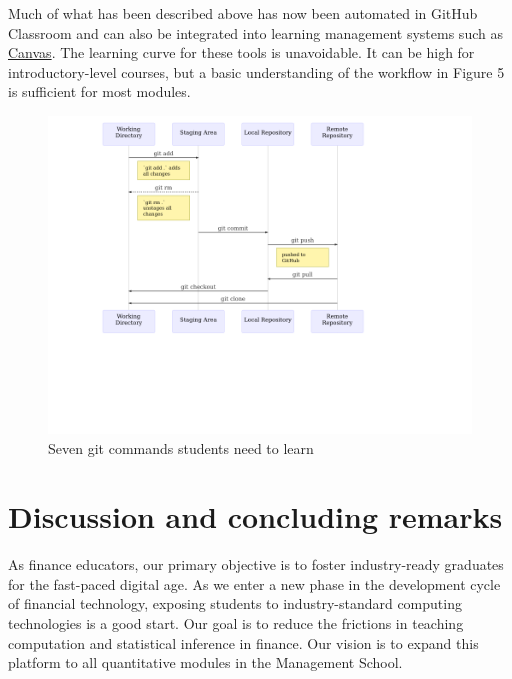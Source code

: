 \documentclass{article}
\begin{document}
Much of what has been described above has now been automated in GitHub
Classroom and can also be integrated into learning management systems
such as
\href{https://docs.github.com/en/education/manage-coursework-with-github-classroom/teach-with-github-classroom/connect-a-learning-management-system-to-github-classroom}{Canvas}.
The learning curve for these tools is unavoidable. It can be high for
introductory-level courses, but a basic understanding of the workflow in
Figure 5 is sufficient for most modules.

\begin{figure}

{\centering \includegraphics[width=4.96in]{git} 

}

\caption{Seven git commands students need to learn}\label{fig:github-workflow}
\end{figure}

\hypertarget{discussion-and-concluding-remarks}{%
\section{Discussion and concluding
remarks}\label{discussion-and-concluding-remarks}}

As finance educators, our primary objective is to foster industry-ready
graduates for the fast-paced digital age. As we enter a new phase in the
development cycle of financial technology, exposing students to
industry-standard computing technologies is a good start. Our goal is to
reduce the frictions in teaching computation and statistical inference
in finance. Our vision is to expand this platform to all quantitative
modules in the Management School.
\end{document}
